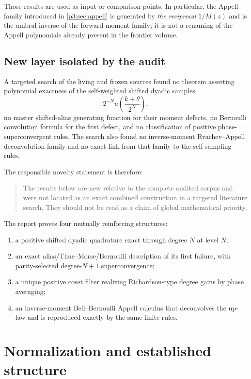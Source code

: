 \documentclass[11pt,oneside]{article}
\numberwithin{equation}{section}
\theoremstyle{definition}
\theoremstyle{remark}
\begin{document}
Those results are used as input or comparison points.  In particular, the Appell family introduced in \cref{p3:sec:appell} is generated by \emph{the reciprocal} $1/M(z)$ and is the umbral inverse of the forward moment family; it is not a renaming of the Appell polynomials already present in the frontier volume.

\subsection{New layer isolated by the audit}

A targeted search of the living and frozen sources found no theorem asserting polynomial exactness of the self-weighted shifted dyadic samples
\[
 2^{-N}u\!\left(\frac{k+\theta}{2^N}\right),
\]
no master shifted-alias generating function for their moment defects, no Bernoulli convolution formula for the first defect, and no classification of positive phase-superconvergent rules.  The search also found no inverse-moment Rvachev--Appell deconvolution family and no exact link from that family to the self-sampling rules.

The responsible novelty statement is therefore:
\begin{quote}
The results below are new relative to the complete audited \repoPartl{} corpus and were not located as an exact combined construction in a targeted literature search.  They should not be read as a claim of global mathematical priority.
\end{quote}

\begin{statusbox}
The report proves four mutually reinforcing structures:
\begin{enumerate}
\item a positive shifted dyadic quadrature exact through degree $N$ at level $N$;
\item an exact alias/Thue--Morse/Bernoulli description of its first failure, with parity-selected degree-$N+1$ superconvergence;
\item a unique positive coset filter realizing Richardson-type degree gains by phase averaging;
\item an inverse-moment Bell--Bernoulli Appell calculus that deconvolves the up-law and is reproduced exactly by the same finite rules.
\end{enumerate}
\end{statusbox}

\section{Normalization and established structure}
\label{p3:sec:background}
\end{document}

